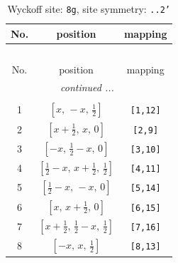\documentclass[fleqn,8pt]{jsarticle}
\begin{document}
\renewcommand{\arraystretch}{1.2}
\begin{longtable}{ccc}
\caption{Wyckoff site: {\tt 8g}, site symmetry: {\tt ..2'}}
 \\
 \hline \hline
No. & position & mapping \\ \hline \endfirsthead

\multicolumn{2}{l}{\tablename\ \thetable{}} \\
 \hline \hline
No. & position & mapping \\ \hline \endhead

 \hline \hline
\multicolumn{2}{r}{\footnotesize\it continued ...} \\ \endfoot

 \hline \hline
\multicolumn{2}{r}{} \\ \endlastfoot

1 & $\left[ x,\, - x,\, \frac{1}{2} \right]$ & {\tt [1,12]} \\ \hline
2 & $\left[ x + \frac{1}{2},\, x,\, 0 \right]$ & {\tt [2,9]} \\ \hline
3 & $\left[ - x,\, \frac{1}{2} - x,\, 0 \right]$ & {\tt [3,10]} \\ \hline
4 & $\left[ \frac{1}{2} - x,\, x + \frac{1}{2},\, \frac{1}{2} \right]$ & {\tt [4,11]} \\ \hline
5 & $\left[ \frac{1}{2} - x,\, - x,\, 0 \right]$ & {\tt [5,14]} \\ \hline
6 & $\left[ x,\, x + \frac{1}{2},\, 0 \right]$ & {\tt [6,15]} \\ \hline
7 & $\left[ x + \frac{1}{2},\, \frac{1}{2} - x,\, \frac{1}{2} \right]$ & {\tt [7,16]} \\ \hline
8 & $\left[ - x,\, x,\, \frac{1}{2} \right]$ & {\tt [8,13]} \\
\end{longtable}
\renewcommand{\arraystretch}{1.2}
\end{document}
